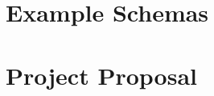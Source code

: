 \documentclass[12pt,twoside,notitlepage]{report}
\begin{document}
\cleardoublepage

\chapter{Example Schemas}



\cleardoublepage

\chapter{Project Proposal}


\end{document}
